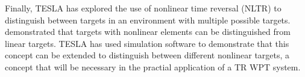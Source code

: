 Finally, TESLA has explored the use of nonlinear time reversal (NLTR) to distinguish between targets in an environment with multiple possible targets. \cite{nltr-wave-chaotic} demonstrated that targets with nonlinear elements can be distinguished from linear targets.  TESLA has used simulation software to demonstrate that this concept can be extended to distinguish between different nonlinear targets, a concept that will be necessary in the practial application of a TR WPT system.
